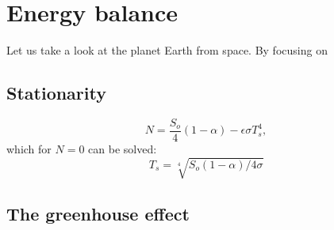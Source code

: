 \documentclass[12pt]{book}
\begin{document}
%
%
%
%
%
% 
%


\chapter{Energy balance}
Let us take a look at the planet Earth from space. By focusing on 

\section{Stationarity}


\begin{equation}
N = \frac{S_o}{4}(1-\alpha) - \epsilon \sigma T_s^4,
\end{equation}
\noindent which for $N=0$ can be solved:
\begin{equation}
T_s = \sqrt[4]{S_o(1-\alpha)/4\sigma}
\end{equation}



\section{The greenhouse effect}
\end{document}
